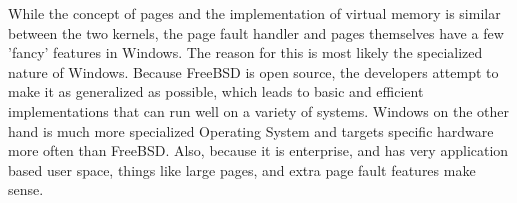 \documentclass[titlepage]{article}
\begin{document}
\begin{singlespace}
While the concept of pages and the implementation of virtual memory is similar between the two kernels, the page fault handler and pages themselves have a few 'fancy' features in Windows. The reason for this is most likely the specialized nature of Windows. Because FreeBSD is open source, the developers attempt to make it as generalized as possible, which leads to basic and efficient implementations that can run well on a variety of systems. Windows on the other hand is much more specialized Operating System and targets specific hardware more often than FreeBSD. Also, because it is enterprise, and has very application based user space, things like large pages, and extra page fault features make sense.\\ 

\end{singlespace}
\end{document}
